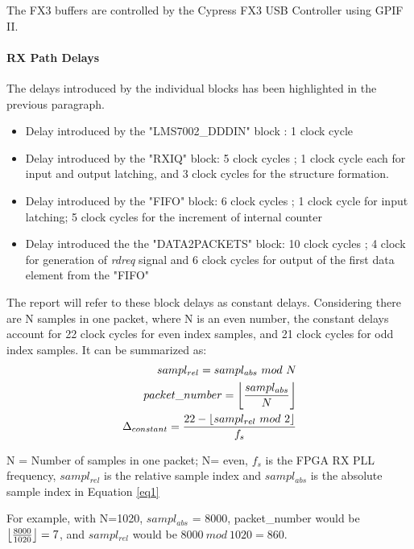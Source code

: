The FX3 buffers are controlled by the Cypress FX3 USB Controller using  \ac{GPIF} II.

\paragraph{RX Path Delays}
The delays introduced by the individual blocks has been highlighted in the previous paragraph.
\begin{itemize}
\item{Delay introduced by the "LMS7002\_DDDIN" block : 1 clock cycle}
\item{Delay introduced by the "RXIQ" block: 5 clock cycles ; 1 clock cycle each for input and output latching, and 3 clock cycles for the structure formation.}
\item{Delay introduced by the "FIFO" block: 6 clock cycles ; 1 clock cycle for input latching; 5 clock cycles for the increment of internal counter}
\item{Delay introduced the the "DATA2PACKETS" block: 10 clock cycles ; 4 clock for generation of \textit{rdreq} signal and 6 clock cycles for output of the first data element from the "FIFO"}
\end{itemize}

The report will refer to these block delays as constant delays.
Considering there are N samples in one packet, where N is an even number, the constant delays account for 22 clock cycles for even index samples, and 21 clock cycles for odd index samples. It can be summarized as:\\

\begin{subequations} \label{eq1}
\begin{align}
	sampl_{rel} = sampl_{abs} \ mod \ N \label{eq1.1}\\ 
  packet\_number= \floor*{\frac{sampl_{abs}}{N}} \label{eq1.2}\\
  \Delta_{constant} = \frac{22 - \floor*{sampl_{rel} \ mod \ 2 }}{f_s} \label{eq1.3}
\end{align}
  
\end{subequations}

N = Number of samples in one packet; N= even, $f_s$ is the \ac{FPGA} RX PLL frequency, $sampl_{rel}$ is the relative sample index and $sampl_{abs}$ is the absolute sample index in Equation \ref{eq1}

For example, with N=1020, $sampl_{abs}$ = 8000, packet\_number would be $\floor*{\frac{8000}{1020}} = 7$, and $sampl_{rel}$ would be  $8000 \ mod \ 1020 = 860$. \\
 
